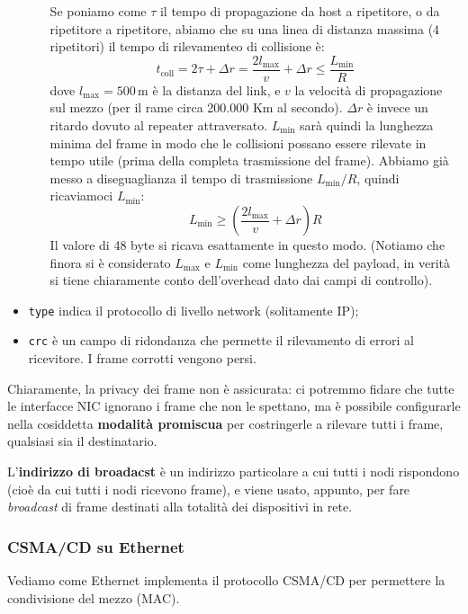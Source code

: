 \documentclass[a4paper,11pt]{article}
\begin{document}
\begin{itemize}
\begin{itemize}
Se poniamo come $\tau$ il tempo di propagazione da host a ripetitore, o da ripetitore a ripetitore, abiamo che su una linea di distanza massima (4 ripetitori) il tempo di rilevamenteo di collisione è:
$$
t_\text{coll} = 2 \tau + \Delta r = \frac{2 l_\text{max}}{v} + \Delta r \leq \frac{L_\text{min}}{R}
$$
dove $l_\text{max} = 500 \, \text{m}$ è la distanza del link, e $v$ la velocità di propagazione sul mezzo (per il rame circa 200.000 Km al secondo). $\Delta r$ è invece un ritardo dovuto al repeater attraversato.
$L_\text{min}$ sarà quindi la lunghezza minima del frame in modo che le collisioni possano essere rilevate in tempo utile (prima della completa trasmissione del frame). Abbiamo già messo a diseguaglianza il tempo di trasmissione $L_\text{min} / R$, quindi ricaviamoci $L_\text{min}$:
$$
L_\text{min} \geq \left( \frac{2 l_\text{max}}{v} + \Delta r \right) R
$$
Il valore di 48 byte si ricava esattamente in questo modo.
(Notiamo che finora si è considerato $L_\text{max}$ e $L_\text{min}$ come lunghezza del payload, in verità si tiene chiaramente conto dell'overhead dato dai campi di controllo).

		\end{itemize}

	\item \lstinline|type| indica il protocollo di livello network (solitamente IP);
	\item \lstinline|crc| è un campo di ridondanza che permette il rilevamento di errori al ricevitore. I frame corrotti vengono persi.
\end{itemize}

Chiaramente, la privacy dei frame non è assicurata: ci potremmo fidare che tutte le interfacce NIC ignorano i frame che non le spettano, ma è possibile configurarle nella cosiddetta \textbf{modalità promiscua} per costringerle a rilevare tutti i frame, qualsiasi sia il destinatario.

L'\textbf{indirizzo di broadacst} è un indirizzo particolare a cui tutti i nodi rispondono (cioè da cui tutti i nodi ricevono frame), e viene usato, appunto, per fare \textit{broadcast} di frame destinati alla totalità dei dispositivi in rete.

\subsubsection{CSMA/CD su Ethernet}
Vediamo come Ethernet implementa il protocollo CSMA/CD per permettere la condivisione del mezzo (MAC).
\end{document}

